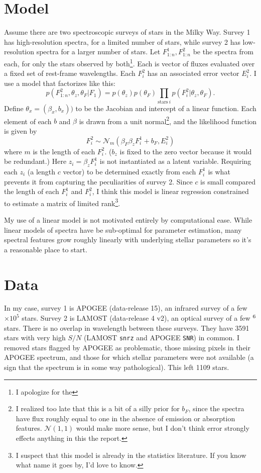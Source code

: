 \documentclass[12pt]{article}
\begin{document}
\section{Model}
Assume there are two spectroscopic surveys of stars in the Milky Way.
Survey 1 has high-resolution spectra, for a limited number of stars, while survey 2 has low-resolution spectra for a larger number of stars.
Let $F^1_{1:n}, F^2_{1:n}$ be the spectra from each, for only the stars observed by both\footnote{I apologize for the }.
Each is vector of fluxes evaluated over a fixed set of rest-frame wavelengths.
Each $F^2_i$ has an associated error vector $E^2_i$.
I use a model that factorizes like this:
\begin{equation}
    p(F^2_{1:n}, \theta_z, \theta_F| F_1) = p(\theta_z) p(\theta_F) \prod_{\mathrm{stars}~i}  p(F^2_i | \theta_z, \theta_F).
\end{equation}
Define $\theta_x = (\beta_x, b_x))$ to be the Jacobian and intercept of a linear function.
Each element of each $b$ and $\beta$ is drawn from a unit normal\footnote{I realized too late that this is a bit of a silly prior for $b_F$, since the spectra have flux roughly equal to one in the absence of emission or absorption features.  $\mathcal{N}(1, 1)$ would make more sense, but I don't think error strongly effects anything in this the report.}, and the likelihood function is given by
\begin{equation}
    F^2_i \sim \mathcal{N}_m(\beta_F \beta_z F^1_i + b_F, E^2_i)
\end{equation}
where $m$ is the length of each $F^2_i$.
($b_z$ is fixed to the zero vector because it would be redundant.)
Here $z_i = \beta_z F^1_i$ is not instantiated as a latent variable.
Requiring each $z_i$ (a length $c$ vector) to be determined exactly from each $F^1_i$ is what prevents it from capturing the peculiarities of survey 2.
Since $c$ is small compared the length of each $F^1_i$ and $F^2_i$, I think this model is linear regression constrained to estimate a matrix of limited rank\footnote{I suspect that this model is already in the statistics literature.  If you know what name it goes by, I'd love to know.}.

My use of a linear model is not motivated entirely by computational ease.  
While linear models of spectra have be sub-optimal for parameter estimation, many spectral features grow roughly linearly with underlying stellar parameters so it's a reasonable place to start.

\section{Data}
In my case, survey 1 is APOGEE (data-release 15), an infrared survey of a few $ \times 10^5$ stars.
Survey 2 is LAMOST (data-release 4 v2), an optical survey of a few $\time 10^6$ stars.
There is no overlap in wavelength between these surveys.
They have 3591 stars with very high $S/N$ (LAMOST \texttt{snrz} and APOGEE \texttt{SNR}) in common.
I removed stars flagged by APOGEE as problematic, those missing pixels in their APOGEE spectrum, and those for which stellar parameters were not available (a sign that the spectrum is in some way pathological).
This left 1109 stars.
\end{document}
